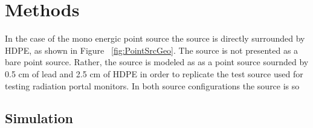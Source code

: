 \section{Methods}

In the case of the mono energic point source the source is directly surrounded by HDPE, as shown in Figure ~\ref{fig:PointSrcGeo}. 
The  source is not presented as a bare point source.
Rather, the source is modeled as as a point  source sournded by 0.5 cm of lead and 2.5 cm of HDPE in order to replicate the test source used for testing radiation portal monitors.
In both source configurations the source is so

\subsection{Simulation}
%

